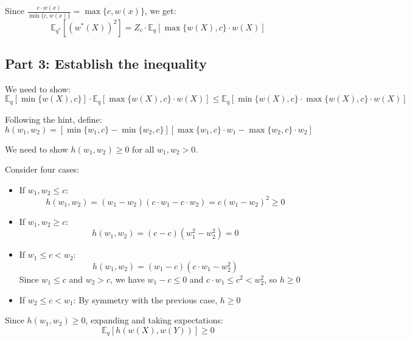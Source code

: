Since $\frac{c \cdot w(x)}{\min\{c, w(x)\}} = \max\{c, w(x)\}$, we get:
\begin{equation}
\mathbb{E}_{q^*}[(w^*(X))^2] = Z_c \cdot \mathbb{E}_q[\max\{w(X), c\} \cdot w(X)]
\end{equation}

\subsection*{Part 3: Establish the inequality}

We need to show:
\begin{equation}
\mathbb{E}_q[\min\{w(X), c\}] \cdot \mathbb{E}_q[\max\{w(X), c\} \cdot w(X)] \leq \mathbb{E}_q[\min\{w(X), c\} \cdot \max\{w(X), c\} \cdot w(X)]
\end{equation}

Following the hint, define:
\begin{equation}
h(w_1, w_2) = [\min\{w_1, c\} - \min\{w_2, c\}][\max\{w_1, c\} \cdot w_1 - \max\{w_2, c\} \cdot w_2]
\end{equation}

We need to show $h(w_1, w_2) \geq 0$ for all $w_1, w_2 > 0$.

Consider four cases:
\begin{itemize}
\item If $w_1, w_2 \leq c$: 
\begin{equation}
h(w_1, w_2) = (w_1 - w_2)(c \cdot w_1 - c \cdot w_2) = c(w_1 - w_2)^2 \geq 0
\end{equation}

\item If $w_1, w_2 \geq c$: 
\begin{equation}
h(w_1, w_2) = (c - c)(w_1^2 - w_2^2) = 0
\end{equation}

\item If $w_1 \leq c < w_2$: 
\begin{equation}
h(w_1, w_2) = (w_1 - c)(c \cdot w_1 - w_2^2)
\end{equation}
Since $w_1 \leq c$ and $w_2 > c$, we have $w_1 - c \leq 0$ and $c \cdot w_1 \leq c^2 < w_2^2$, so $h \geq 0$

\item If $w_2 \leq c < w_1$: By symmetry with the previous case, $h \geq 0$
\end{itemize}

Since $h(w_1, w_2) \geq 0$, expanding and taking expectations:
\begin{equation}
\mathbb{E}_q[h(w(X), w(Y))] \geq 0
\end{equation}

